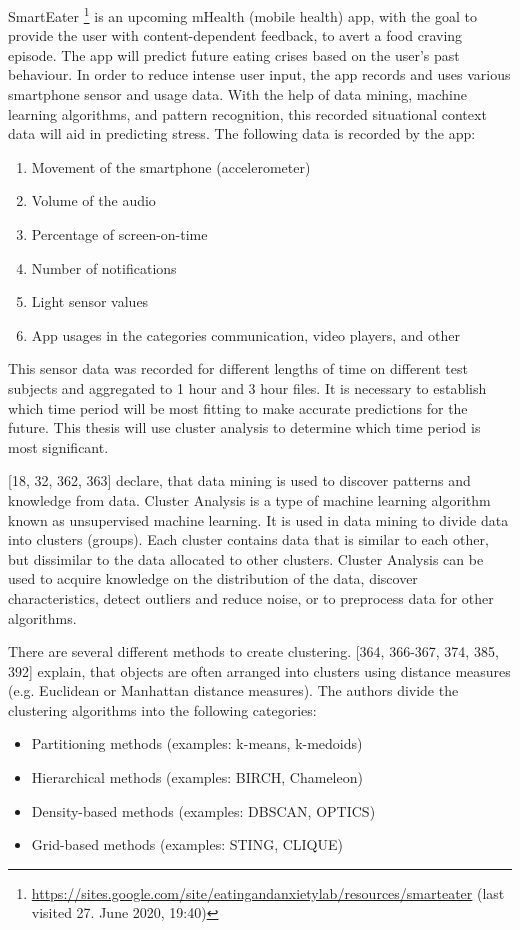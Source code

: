 SmartEater \footnote{\url{https://sites.google.com/site/eatingandanxietylab/resources/smarteater} (last visited 27. June 2020, 19:40)} is an upcoming mHealth (mobile health) app, with the goal to provide the user with content-dependent feedback, to avert a food craving episode. The app will predict future eating crises based on the user's past behaviour. In order to reduce intense user input, the app records and uses various smartphone sensor and usage data. With the help of data mining, machine learning algorithms, and pattern recognition, this recorded situational context data will aid in predicting stress. The following data is recorded by the app:

\begin{enumerate}
	\item Movement of the smartphone (accelerometer)
	\item Volume of the audio
	\item Percentage of screen-on-time
	\item Number of notifications
	\item Light sensor values
	\item App usages in the categories communication, video players, and other
\end{enumerate}

This sensor data was recorded for different lengths of time on different test subjects and aggregated to 1 hour and 3 hour files. It is necessary to establish which time period will be most fitting to make accurate predictions for the future. This thesis will use cluster analysis to determine which time period is most significant.

\textcite{han2011data}[18, 32, 362, 363] declare, that data mining is used to discover patterns and knowledge from data. Cluster Analysis is a type of machine learning algorithm known as unsupervised machine learning. It is used in data mining to divide data into clusters (groups). Each cluster contains data that is similar to each other, but dissimilar to the data allocated to other clusters. Cluster Analysis can be used to acquire knowledge on the distribution of the data, discover characteristics, detect outliers and reduce noise, or to preprocess data for other algorithms. 

There are several different methods to create clustering. \textcite{han2011data}[364, 366-367, 374, 385, 392] explain, that objects are often arranged into clusters using distance measures (e.g. Euclidean or Manhattan distance measures). 
The authors divide the clustering algorithms into the following categories:
\begin{itemize}
	\item Partitioning methods (examples: k-means, k-medoids)
	\item Hierarchical methods (examples: BIRCH, Chameleon)
	\item Density-based methods (examples: DBSCAN, OPTICS)
	\item Grid-based methods (examples: STING, CLIQUE)
\end{itemize}


